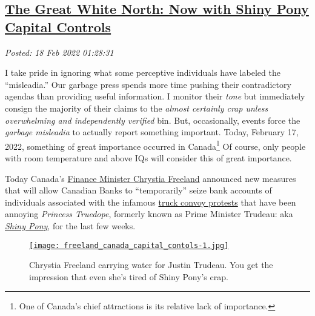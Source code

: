 %

\subsection*{\href{http://analyzethedatanotthedrivel.org/2022/02/17/the-great-white-north-now-with-shiny-pony-capital-controls/}{The Great White North: Now with Shiny Pony Capital Controls}}


\noindent\emph{Posted: 18 Feb 2022 01:28:31}
\vspace{6pt}

I take pride in ignoring what some perceptive individuals have labeled
the ``misleadia.'' Our garbage press spends more time pushing their
contradictory agendas than providing useful information. I monitor their
\emph{tone} but immediately consign the majority of their claims to the
\emph{almost certainly crap unless overwhelming and independently
verified} bin. But, occasionally, events force the \emph{garbage
misleadia} to actually report something important. Today, February 17,
2022, something of great importance occurred in
Canada\footnote{One of Canada's chief attractions is its relative lack of
  importance.
} %
Of course, only people with room temperature and above IQs will consider
this of great importance.

Today Canada's
\href{https://www.cbc.ca/news/politics/ottawa-protests-frozen-bank-accounts-1.6355396}{Finance
Minister Chrystia Freeland} announced new measures that will allow
Canadian Banks to ``temporarily'' seize bank accounts of individuals
associated with the infamous
\href{https://www.cbc.ca/news/canada/london/trucker-protest-convoy-southwestern-ontario-1.6329118}{truck
convoy protests} that have been annoying \emph{Princess Truedope},
formerly known as Prime Minister Trudeau: aka
\href{https://www.michiganradio.org/2016-03-08/justin-trudeau-the-shiny-pony-who-became-canadas-prime-minister}{\emph{Shiny
Pony}}, for the last few weeks.

\captionsetup[figure]{labelformat=empty}
\begin{SCfigure}
\centering
\href{https://www.cbc.ca/news/canada/london/trucker-protest-convoy-southwestern-ontario-1.6329118}{\texttt{[image: freeland\_canada\_capital\_contols-1.jpg]}}
\caption[Chrystia Freeland carrying water for Justin Trudeau.]{Chrystia Freeland carrying water for Justin Trudeau. You get the impression that
even she's tired of Shiny Pony's crap.}
\label{fig:7307x0}
\end{SCfigure}

